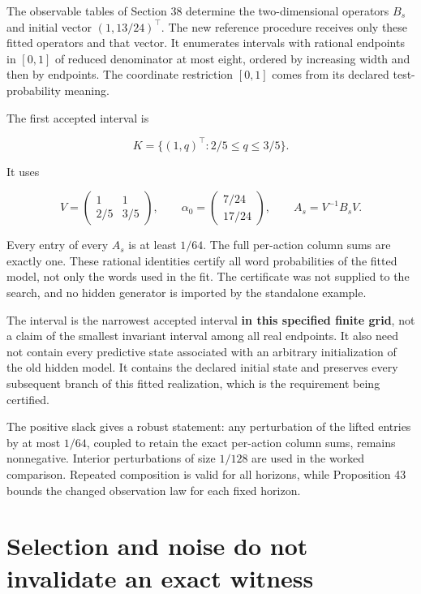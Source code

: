 The observable tables of Section 38 determine the two-dimensional
operators \(B_s\) and initial vector \((1,13/24)^\top\). The new
reference procedure receives only these fitted operators and that
vector. It enumerates intervals with rational endpoints in \([0,1]\) of
reduced denominator at most eight, ordered by increasing width and then
by endpoints. The coordinate restriction \([0,1]\) comes from its
declared test-probability meaning.

The first accepted interval is

\[
\boxed{K=\{(1,q)^\top:2/5\leq q\leq3/5\}.}
\]

It uses

\[
V=\begin{pmatrix}1&1\\2/5&3/5\end{pmatrix},
\qquad \alpha_0=\begin{pmatrix}7/24\\17/24\end{pmatrix},
\qquad A_s=V^{-1}B_sV.
\]

Every entry of every \(A_s\) is at least \(1/64\). The full per-action
column sums are exactly one. These rational identities certify all word
probabilities of the fitted model, not only the words used in the fit.
The certificate was not supplied to the search, and no hidden generator
is imported by the standalone example.

The interval is the narrowest accepted interval \textbf{in this
specified finite grid}, not a claim of the smallest invariant interval
among all real endpoints. It also need not contain every predictive
state associated with an arbitrary initialization of the old hidden
model. It contains the declared initial state and preserves every
subsequent branch of this fitted realization, which is the requirement
being certified.

The positive slack gives a robust statement: any perturbation of the
lifted entries by at most \(1/64\), coupled to retain the exact
per-action column sums, remains nonnegative. Interior perturbations of
size \(1/128\) are used in the worked comparison. Repeated composition
is valid for all horizons, while Proposition 43 bounds the changed
observation law for each fixed horizon.

\section{Selection and noise do not invalidate an exact witness}\label{LSM:selection-and-noise-do-not-invalidate-an-exact-witness}

